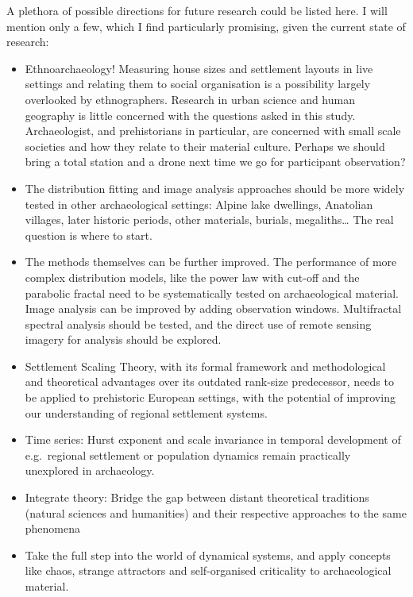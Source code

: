 \documentclass[
  12pt,
  a4paper, twoside]{book}
\providecommand{\tightlist}{%
  \setlength{\itemsep}{0pt}\setlength{\parskip}{0pt}}
\begin{document}
A plethora of possible directions for future research could be listed here. I will mention only a few, which I find particularly promising, given the current state of research:

\begin{itemize}
\tightlist
\item
  Ethnoarchaeology! Measuring house sizes and settlement layouts in live settings and relating them to social organisation is a possibility largely overlooked by ethnographers. Research in urban science and human geography is little concerned with the questions asked in this study. Archaeologist, and prehistorians in particular, are concerned with small scale societies and how they relate to their material culture. Perhaps we should bring a total station and a drone next time we go for participant observation?
\item
  The distribution fitting and image analysis approaches should be more widely tested in other archaeological settings: Alpine lake dwellings, Anatolian villages, later historic periods, other materials, burials, megaliths\ldots{} The real question is where to start.
\item
  The methods themselves can be further improved. The performance of more complex distribution models, like the power law with cut-off and the parabolic fractal need to be systematically tested on archaeological material. Image analysis can be improved by adding observation windows. Multifractal spectral analysis should be tested, and the direct use of remote sensing imagery for analysis should be explored.
\item
  Settlement Scaling Theory, with its formal framework and methodological and theoretical advantages over its outdated rank-size predecessor, needs to be applied to prehistoric European settings, with the potential of improving our understanding of regional settlement systems.
\item
  Time series: Hurst exponent and scale invariance in temporal development of e.g.~regional settlement or population dynamics remain practically unexplored in archaeology.
\item
  Integrate theory: Bridge the gap between distant theoretical traditions (natural sciences and humanities) and their respective approaches to the same phenomena
\item
  Take the full step into the world of dynamical systems, and apply concepts like chaos, strange attractors and self-organised criticality to archaeological material.
\end{itemize}
\end{document}
